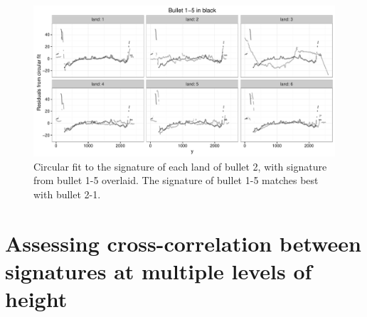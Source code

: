 \documentclass[aoas]{imsart}\usepackage[]{graphicx}\usepackage[]{color}
\newenvironment{knitrout}{}{} %
\begin{document}
\begin{figure}[hbtp]
  \centering
\begin{knitrout}
\color{fgcolor}
\includegraphics[width=\textwidth]{circlefits-1} 

\end{knitrout}
\caption{Circular fit to the signature of each land of bullet 2, with signature from bullet 1-5 overlaid.\label{fig:circlefits} The signature of bullet 1-5 matches best with bullet 2-1.}
\end{figure}

\newpage
\section{Assessing cross-correlation between signatures at multiple levels of height}\label{supp:ccf}
\end{document}
